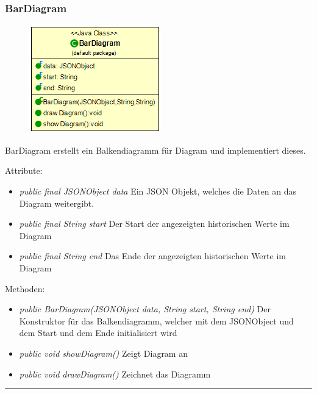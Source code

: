 \subsubsection{BarDiagram}
\begin{minipage}{0.3\textwidth}
    \begin{figure}[H]
        {\centering\includegraphics[scale = 0.5
        ]{media/view/diagram/BarDiagram_Class.png}}
    \end{figure}
    \end{minipage} \hfill
    \begin{minipage}{0.6\textwidth}
BarDiagram erstellt ein Balkendiagramm für Diagram und implementiert dieses.
\end{minipage}
\vspace{\baselineskip}
Attribute: \begin{itemize} [noitemsep]
    \item \emph{public final JSONObject data} Ein JSON Objekt, welches die Daten an das Diagram weitergibt.
    \item \emph{public final String start} Der Start der angezeigten historischen Werte im Diagram
    \item \emph{public final String end} Das Ende der angezeigten historischen Werte im Diagram
\end{itemize}
Methoden: \begin{itemize} [noitemsep]
    \item \emph{public BarDiagram(JSONObject data, String start, String end)} Der Konstruktor für das Balkendiagramm, welcher mit dem JSONObject und dem Start und dem Ende initialisiert wird
    \item \emph{public void showDiagram()} Zeigt Diagram an
    \item \emph{public void drawDiagram()} Zeichnet das Diagramm
\end{itemize}

\rule{\textwidth}{0.4pt}

